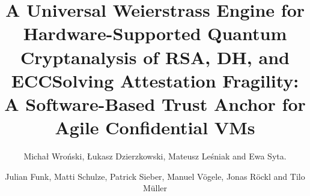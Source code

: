 \documentclass[runningheads]{llncs}
\begin{document}
\setcounter{page}{7}
\author{Michał Wroński, Łukasz Dzierzkowski, Mateusz Leśniak and Ewa Syta.}
\title{A Universal Weierstrass Engine for Hardware-Supported Quantum Cryptanalysis of RSA, DH, and ECC}
\maketitle
\clearpage

\setcounter{page}{8}
\author{Julian Funk, Matti Schulze, Patrick Sieber, Manuel Vögele, Jonas Röckl and Tilo Müller}
\title{Solving Attestation Fragility: A Software-Based Trust Anchor for Agile Confidential VMs}
\maketitle

\clearpage
\setcounter{page}{9}
\phantom{Author Index}
\clearpage
\end{document}
